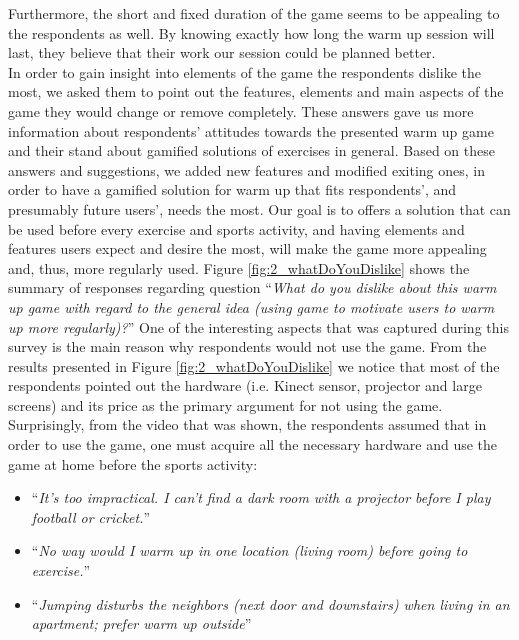 Furthermore, the short and fixed duration of the game seems to be appealing to the respondents as well. By knowing exactly how long the warm up session will last, they believe that their work our session could be planned better.\\
In order to gain insight into elements of the game the respondents dislike the most, we asked them to point out the features, elements and main aspects of the game they would change or remove completely. These answers gave us more information about respondents' attitudes towards the presented warm up game and their stand about gamified solutions of exercises in general. Based on these answers and suggestions, we added new features and modified exiting ones, in order to have a gamified solution for warm up that fits respondents', and presumably future users', needs the most. Our goal is to offers a solution that can be used before every exercise and sports activity, and having elements and features users expect and desire the most, will make the game more appealing and, thus, more regularly used.
Figure \ref{fig:2_whatDoYouDislike} shows the summary of responses regarding question ``\textit{What do you dislike about this warm up game with regard to the general idea (using game to motivate users to warm up more regularly)?}''
One of the interesting aspects that was captured during this survey is the main reason why respondents would not use the game. From the results presented in Figure \ref{fig:2_whatDoYouDislike} we notice that most of the respondents pointed out the hardware (i.e. Kinect sensor, projector and large screens) and its price as the primary argument for not using the game. Surprisingly, from the video that was shown, the respondents assumed that in order to use the game, one must acquire all the necessary hardware and use the game at home before the sports activity:
\begin{itemize}
\item ``\textit{It's too impractical. I can't find a dark room with a projector before I play football or cricket.}''
\item ``\textit{No way would I warm up in one location (living room) before going to exercise.}''
\item ``\textit{Jumping disturbs the neighbors (next door and downstairs) when living in an apartment; prefer warm up outside}''
\end{itemize} 
